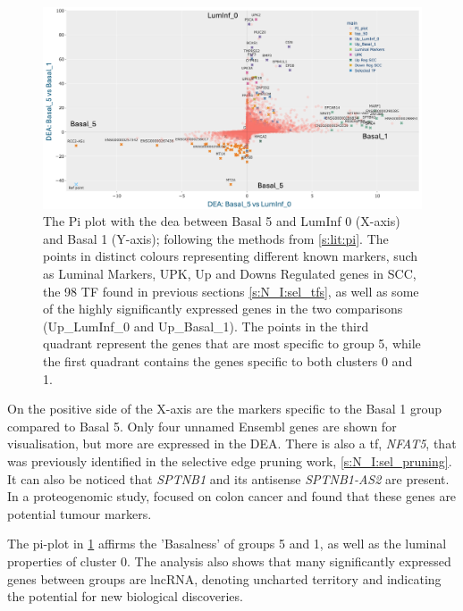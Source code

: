 \begin{figure}
    \centering
    \includegraphics[width=1.0\textwidth,height=1.0\textheight,keepaspectratio]{Sections/Network_II/resources/reward/PI_Basal_5.png}
    \caption[Pi plot highlighting the properties for Basal 5]{The Pi plot with the \acrshort{dea} between Basal 5 and LumInf 0 (X-axis) and Basal 1 (Y-axis); following the methods from \cref{s:lit:pi}. The points in distinct colours representing different known markers, such as Luminal Markers, UPK, Up and Downs Regulated genes in \gls{SCC}, the 98 TF found in previous sections \cref{s:N_I:sel_tfs}, as well as some of the highly significantly expressed genes in the two comparisons (Up\_LumInf\_0 and Up\_Basal\_1). The points in the third quadrant represent the genes that are most specific to group 5, while the first quadrant contains the genes specific to both clusters 0 and 1.}
    \label{fig:N_II:pi_basal_5}
\end{figure}


On the positive side of the X-axis are the markers specific to the Basal 1 group compared to Basal 5. Only four unnamed Ensembl genes are shown for visualisation, but more are expressed in the DEA. There is also a \acrlong{tf}, \textit{NFAT5}, that was previously identified in the selective edge pruning work, \cref{s:N_I:sel_pruning}. It can also be noticed that \textit{SPTNB1} and its antisense \textit{SPTNB1-AS2} are present. In a proteogenomic study, \citep{Fanayan2013-uj} focused on colon cancer and found that these genes are potential tumour markers.

The pi-plot in \cref{fig:N_II:pi_basal_5} affirms the 'Basalness' of groups 5 and 1, as well as the luminal properties of cluster 0. The analysis also shows that many significantly expressed genes between groups are \acrlong{lncRNA}, denoting uncharted territory and indicating the potential for new biological discoveries.



